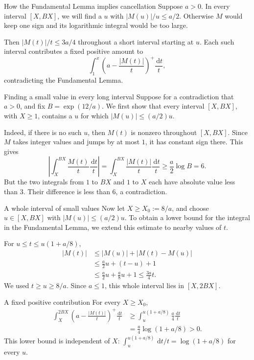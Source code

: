 \documentclass[aspectratio=169,11pt]{beamer}
\newcommand{\dd}{\,\mathrm d}
\begin{document}
\begin{frame}{How the Fundamental Lemma implies cancellation}
Suppose $a>0$. In every interval $[X,BX]$, we will find a $u$ with $|M(u)|/u\le a/2$. Otherwise $M$ would keep one sign and its logarithmic integral would be too large.

Then $|M(t)|/t\le3a/4$ throughout a short interval starting at $u$. Each such interval contributes a fixed positive amount to
\[\int_1^x\left(a-\frac{|M(t)|}t\right)^+\frac{\dd t}t,\]
contradicting the Fundamental Lemma.
\end{frame}
\begin{frame}{Finding a small value in every long interval}
Suppose for a contradiction that $a>0$, and fix $B=\exp(12/a)$. We first show that every interval $[X,BX]$, with $X\ge1$, contains a $u$ for which $|M(u)|\le(a/2)u$.

Indeed, if there is no such $u$, then $M(t)$ is nonzero throughout $[X,BX]$. Since $M$ takes integer values and jumps by at most $1$, it has constant sign there. This gives
\[\left|\int_X^{BX}\frac{M(t)}t\frac{\dd t}t\right|
=\int_X^{BX}\frac{|M(t)|}t\frac{\dd t}t\ge\frac a2\log B=6.\]
But the two integrals from $1$ to $BX$ and $1$ to $X$ each have absolute value less than $3$. Their difference is less than $6$, a contradiction.
\end{frame}
\begin{frame}{A whole interval of small values}
Now let $X\ge X_0:=8/a$, and choose $u\in[X,BX]$ with $|M(u)|\le(a/2)u$. To obtain a lower bound for the integral in the Fundamental Lemma, we extend this estimate to nearby values of $t$.

For $u\le t\le u(1+a/8)$,
\begin{align*}
|M(t)|&\le|M(u)|+|M(t)-M(u)|\\
&\le\frac a2u+(t-u)+1\\
&\le\frac a2u+\frac a8u+1\le\frac{3a}4t.
\end{align*}
We used $t\ge u\ge8/a$. Since $a\le1$, this whole interval lies in $[X,2BX]$.
\end{frame}
\begin{frame}{A fixed positive contribution}
For every $X\ge X_0$,
\begin{align*}
\int_X^{2BX}\left(a-\frac{|M(t)|}t\right)^+\frac{\dd t}t
&\ge\int_u^{u(1+a/8)}\frac a4\frac{\dd t}t\\
&=\frac a4\log(1+a/8)>0.
\end{align*}
This lower bound is independent of $X$: $\int_u^{u(1+a/8)}\dd t/t=\log(1+a/8)$ for every $u$.
\end{frame}
\end{document}
